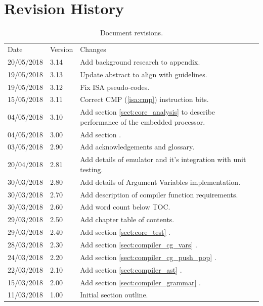 \documentclass[11pt,a4paper]{report}
\begin{document}
\pagestyle{plain}

\section*{Revision History}
\begin{table}[h]
\def\arraystretch{1.3}
    \begin{tabularx}{\textwidth}{|l|l|X|}
    \hline
    Date & Version & Changes \\
    \arrayrulecolor{blue9}
	\specialrule{2pt}{-2pt}{0pt}
	20/05/2018 & 3.14 & Add background research to appendix. \\ \hline
	19/05/2018 & 3.13 & Update abstract to align with guidelines. \\ \hline
	19/05/2018 & 3.12 & Fix ISA pseudo-codes. \\ \hline
	15/05/2018 & 3.11 & Correct CMP (\ref{isa:cmp}) instruction bits. \\ \hline
	04/05/2018 & 3.10 & Add section \ref{sect:core_analysis} {\nameref{sect:core_analysis}} to describe performance of the embedded processor. \\ \hline
	04/05/2018 & 3.00 & Add section {\nameref{sect:preface}}. \\ \hline
	03/05/2018 & 2.90 & Add acknowledgements and glossary. \\ \hline
	20/04/2018 & 2.81 & Add details of emulator and it's integration with unit testing.\\ \hline
	30/03/2018 & 2.80 & Add details of Argument Variables implementation. \\ \hline
	30/03/2018 & 2.70 & Add description of compiler function requirements. \\ \hline
	30/03/2018 & 2.60 & Add word count below TOC. \\ \hline
	29/03/2018 & 2.50 & Add chapter table of contents. \\ \hline
	29/03/2018 & 2.40 & Add section \ref{sect:core_test} \nameref{sect:core_test}. \\ \hline
	28/03/2018 & 2.30 & Add section \ref{sect:compiler_cg_vars} \nameref{sect:compiler_cg_vars}. \\ \hline
	24/03/2018 & 2.20 & Add section \ref{sect:compiler_cg_push_pop} \nameref{sect:compiler_cg_push_pop}. \\ \hline
	22/03/2018 & 2.10 & Add section \ref{sect:compiler_ast} \nameref{sect:compiler_ast}. \\ \hline
	15/03/2018 & 2.00 & Add section \ref{sect:compiler_grammar} \nameref{sect:compiler_grammar}. \\ \hline
	11/03/2018 & 1.00 & Initial section outline. \\ \hline
    \end{tabularx}
    \caption{Document revisions.}
\end{table}
\end{document}
